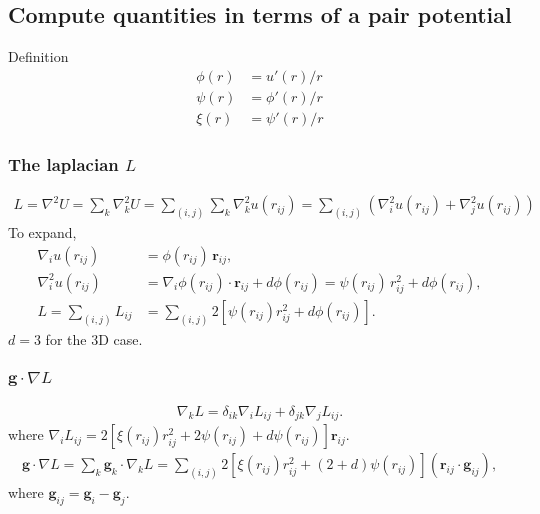 \documentclass{article}
\begin{document}
\subsection{Compute quantities in terms of a pair potential}

Definition
\begin{align*}
  \phi(r) & = u'(r)/r \\
  \psi(r) & = \phi'(r)/r \\
  \xi(r)  & = \psi'(r)/r
\end{align*}



\subsubsection{The laplacian $L$}
\begin{align*}
L = \nabla^2 U 
  = \sum_k \nabla_k^2 U
  = \sum_{(i, j)} \sum_k \nabla_k^2 u(r_{ij})
  = \sum_{(i, j)} (\nabla_i^2 u(r_{ij}) + \nabla_j^2 u(r_{ij}))
\end{align*}
To expand, 
\begin{align*}
\nabla_i u(r_{ij}) 
& = \phi(r_{ij}) \, \mathbf r_{ij}, \\
\nabla_i^2 u(r_{ij})
& = \nabla_i \phi(r_{ij}) \cdot \mathbf r_{ij} + d \phi(r_{ij})
= \psi(r_{ij}) \, r_{ij}^2  + d \phi(r_{ij}), \\
L = \sum_{(i, j)} L_{ij} & = \sum_{(i, j)} 2 [ \psi(r_{ij}) r_{ij}^2 + d \phi(r_{ij}) ].
\end{align*}
$d = 3$ for the 3D case.



\subsubsection{$\mathbf g \cdot \nabla L$}

\begin{align*}
\nabla_k L = \delta_{ik} \nabla_i L_{ij} + \delta_{jk} \nabla_j L_{ij}. 
\end{align*}
where $\nabla_i L_{ij} = 2 [ \xi(r_{ij}) r_{ij}^2 + 2 \psi(r_{ij}) + d \psi(r_{ij}) ] \mathbf r_{ij}$.
\begin{align*}
\mathbf g \cdot \nabla L
= \sum_k \mathbf g_k \cdot \nabla_k L
= \sum_{(i, j)} 2 [ \xi(r_{ij}) r_{ij}^2 + (2 + d) \psi(r_{ij}) ] (\mathbf r_{ij} \cdot \mathbf g_{ij}),
\end{align*}
where $\mathbf g_{ij} = \mathbf g_i - \mathbf g_j$.
\end{document}
